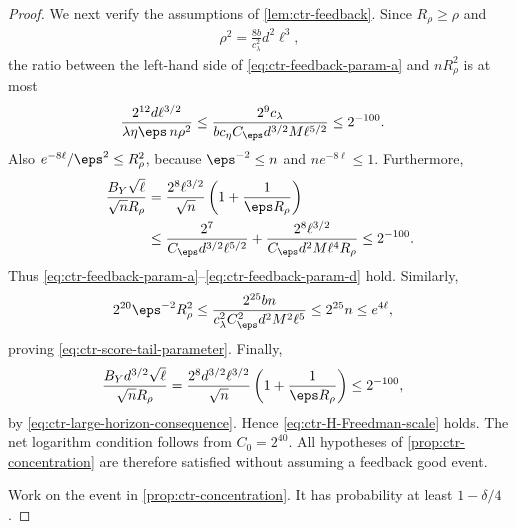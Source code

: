 \begin{proof}
    We next verify the assumptions of \cref{lem:ctr-feedback}.  Since
    $R_\rho\geq\rho$ and
    \begin{align}
        \rho^2
        =\frac{8b}{c_\lambda^2}d^2\ell^3,
        \label{eq:ctr-rho-square}
    \end{align}
    the ratio between the left-hand side of
    \eqref{eq:ctr-feedback-param-a} and $nR_\rho^2$ is at most
    \begin{align}
        \frac{2^{12}d\ell^{3/2}}
        {\lambda\eta\eps\,n\rho^2}
         & \leq
        \frac{2^9c_\lambda}
        {b c_\eta C_\eps d^{3/2}M\ell^{5/2}}
        \leq2^{-100}.
        \label{eq:ctr-verify-feedback-a}
    \end{align}
    Also $e^{-8\ell}/\eps^2\leq R_\rho^2$, because
    $\eps^{-2}\leq n$ and $ne^{-8\ell}\leq1$.  Furthermore,
    \begin{align}
        \frac{B_Y\sqrt\ell}{\sqrt nR_\rho}
         & =\frac{2^8\ell^{3/2}}{\sqrt n}
        \left(1+\frac1{\eps R_\rho}\right)
        \\
         & \leq
        \frac{2^7}{C_\eps d^{3/2}\ell^{5/2}}
        +\frac{2^8\ell^{3/2}}
        {C_\eps d^2M\ell^4R_\rho}
        \leq2^{-100}.
        \label{eq:ctr-verify-feedback-c}
    \end{align}
    Thus \eqref{eq:ctr-feedback-param-a}--\eqref{eq:ctr-feedback-param-d}
    hold.  Similarly,
    \begin{align}
        2^{20}\eps^{-2}R_\rho^2
         & \leq
        \frac{2^{25}bn}
        {c_\lambda^2C_\eps^2d^2M^2\ell^5}
        \leq2^{25}n
        \leq e^{4\ell},
        \label{eq:ctr-verify-score-tail}
    \end{align}
    proving \eqref{eq:ctr-score-tail-parameter}.  Finally,
    \begin{align}
        \frac{B_Yd^{3/2}\sqrt\ell}{\sqrt nR_\rho}
         & =\frac{2^8d^{3/2}\ell^{3/2}}{\sqrt n}
        \left(1+\frac1{\eps R_\rho}\right)
        \leq2^{-100},
        \label{eq:ctr-verify-H-Freedman}
    \end{align}
    by \eqref{eq:ctr-large-horizon-consequence}.  Hence
    \eqref{eq:ctr-H-Freedman-scale} holds.  The net logarithm condition follows
    from $C_0=2^{40}$.  All hypotheses of
    \cref{prop:ctr-concentration} are therefore satisfied without assuming a
    feedback good event.

    Work on the event in \cref{prop:ctr-concentration}.  It has probability at
    least $1-\delta/4$.


\end{proof}
